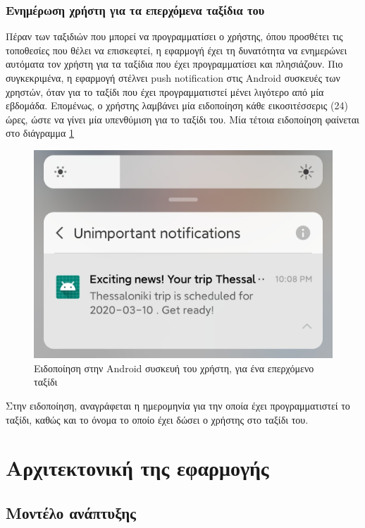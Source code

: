 \documentclass[oneside, 12pt]{book}
\begin{document}
\subsection{Ενημέρωση χρήστη για τα επερχόμενα ταξίδια του} \label{sec:push_notification_upcoming_trip}
Πέραν των ταξιδιών που μπορεί να προγραμματίσει ο χρήστης, όπου προσθέτει τις τοποθεσίες που θέλει να επισκεφτεί, η εφαρμογή έχει τη δυνατότητα να ενημερώνει αυτόματα τον χρήστη για τα ταξίδια που έχει προγραμματίσει και πλησιάζουν. Πιο συγκεκριμένα, η εφαρμογή στέλνει push notification στις Android συσκευές των χρηστών, όταν για το ταξίδι που έχει προγραμματιστεί μένει λιγότερο από μία εβδομάδα. Επομένως, ο χρήστης λαμβάνει μία ειδοποίηση κάθε εικοσιτέσσερις (24) ώρες, ώστε να γίνει μία υπενθύμιση για το ταξίδι του.
Μία τέτοια ειδοποίηση φαίνεται στο διάγραμμα \ref{fig:push_notification}
\begin{figure}[h]
  \centering
  \includegraphics[scale=0.15]{images/push_notification.jpg}
  \caption{\label{fig:push_notification}Ειδοποίηση στην Android συσκευή του χρήστη, για ένα επερχόμενο ταξίδι}
\end{figure}

Στην ειδοποίηση, αναγράφεται η ημερομηνία για την οποία έχει προγραμματιστεί το ταξίδι, καθώς και το όνομα το οποίο έχει δώσει ο χρήστης στο ταξίδι του.

\chapter{Αρχιτεκτονική της εφαρμογής}
\section{Μοντέλο ανάπτυξης}
\end{document}
